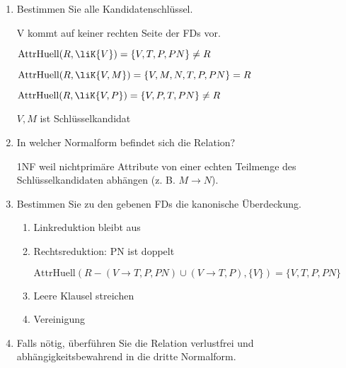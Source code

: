 \documentclass{lehramt-informatik-aufgabe}
\begin{document}
\begin{enumerate}
\item Bestimmen Sie alle Kandidatenschlüssel.

\begin{antwort}
V kommt auf keiner rechten Seite der FDs vor.

$\text{AttrHuell}(R, \liK{V}) = \{V, T, P, PN\} \neq  R$

$\text{AttrHuell}(R, \liK{V, M}) = \{V, M, N, T, P, PN\} = R$

$\text{AttrHuell}(R, \liK{V, P}) = \{V, P, T, PN\} \neq R$

$V, M$ ist Schlüsselkandidat
\end{antwort}

\item In welcher Normalform befindet sich die Relation?

\begin{antwort}
1NF weil nichtprimäre Attribute von einer echten Teilmenge des
Schlüsselkandidaten abhängen (z. B. $M \rightarrow N$).
\end{antwort}

\item Bestimmen Sie zu den gebenen FDs die kanonische Überdeckung.

\begin{antwort}

\begin{enumerate}
\item Linkreduktion bleibt aus

\item Rechtsreduktion: PN ist doppelt

$\text{AttrHuell}(R - (V \rightarrow T, P, PN) \cup (V \rightarrow T, P), \{V\}) = \{V, T, P, PN\}$

\item Leere Klausel streichen

\item Vereinigung


\end{enumerate}

\end{antwort}

\item Falls nötig, überführen Sie die Relation verlustfrei und
abhängigkeitsbewahrend in die dritte Normalform.
\end{enumerate}
\end{document}
